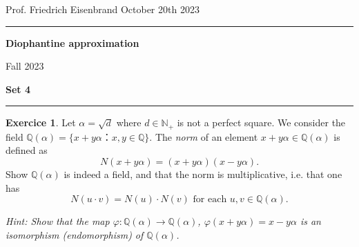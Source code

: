 \documentclass[12pt,a4paper]{article}
\date{}
\theoremstyle{plain}
\newtheorem*{Sol*}{Solution}
\theoremstyle{definition}
\newtheorem{Ex}{Exercice}
\def \Q {\mathbb Q}
\newif\ifsolutions
\newcommand{\exercise}[2]{
			\begin{Ex} #1 \end{Ex}
			\ifsolutions  \begin{Sol*} #2 \end{Sol*} \bigskip \else \bigskip  \fi
		}
\begin{document}
\begin{center}
{Prof. Friedrich Eisenbrand \hfill October 20th 2023}
\end{center}
	
\hrule\vspace{\baselineskip}

\begin{center}
\textbf{Diophantine approximation}

Fall 2023

\bigskip

\textbf{Set 4}
\ifsolutions{\textbf{- Solutions}} \else{} \fi
\end{center}

\hrule\vspace{\baselineskip}



\exercise{ Let $α = \sqrt{d}$ where $d ∈ ℕ_+$ is not a perfect square. We consider the field $ℚ(α) = \{ x + y α ： x, y ∈ℚ \}$.  The \emph{norm} of an element $x +  y α ∈ ℚ(α)$ is defined as
  \begin{displaymath}
    N(x +  y α) = (x +  y α)(x -  y α). 
  \end{displaymath}
  Show $\Q(\alpha)$ is indeed a field, and that the norm is multiplicative, i.e. that one has
  \begin{displaymath}
    N(u⋅v) = N(u)⋅N(v) \text{ for each } u,v ∈ℚ(α). 
  \end{displaymath}

{\bigskip \noindent  \small \emph{ Hint: Show that the map $φ: ℚ(α) → ℚ(α)$, $φ( x + y α ) =  x - y α $ is an isomorphism (endomorphism) of $ℚ(α)$.} }
}
{
	The norm of an element of the field may be understood as the determinant of its multiplication matrix (in any basis).
	Indeed, take $\alpha = x + y \sqrt{d}$, and write the multiplication by $\alpha$ matrix in the basis $\{ 1, \sqrt{d} \}$
	\[
		[ \times \alpha ] = \begin{pmatrix} x & d y \\ y & x \end{pmatrix},
	\]
	which has determinant $x^2 - d y^2$.

	By commutativity of the field, the multiplication maps commute, which yields
		\[
		N(u \cdot v) = \det([ \times (u \cdot v) ]) = \det( [\times u] \cdot [\times v] ) = N(u) \cdot N(v), \]
	as required.

}
\end{document}
